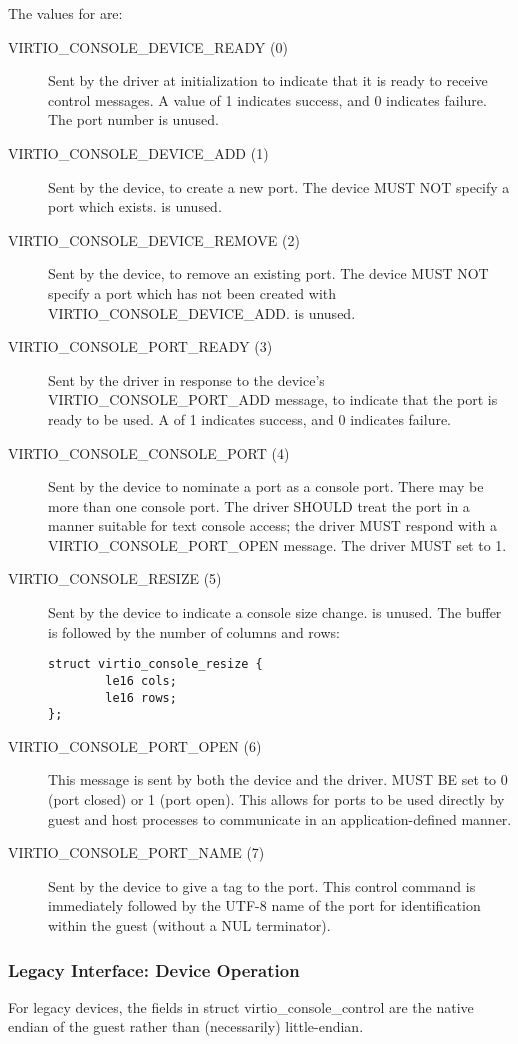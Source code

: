 The values for  are:
\begin{description}
\item [VIRTIO_CONSOLE_DEVICE_READY (0)] Sent by the driver at initialization
  to indicate that it is ready to receive control messages.  A value of
  1 indicates success, and 0 indicates failure.  The port number is unused.
\item [VIRTIO_CONSOLE_DEVICE_ADD (1)] Sent by the device, to create a new
  port.  The device MUST NOT specify a port which exists.   is unused.
\item [VIRTIO_CONSOLE_DEVICE_REMOVE (2)] Sent by the device, to remove an
  existing port.  The device MUST NOT specify a port which has not been
  created with VIRTIO_CONSOLE_DEVICE_ADD.   is unused.
\item [VIRTIO_CONSOLE_PORT_READY (3)] Sent by the driver in response
  to the device's VIRTIO_CONSOLE_PORT_ADD message, to indicate that
  the port is ready to be used. A  of 1 indicates success, and 0
  indicates failure.
\item [VIRTIO_CONSOLE_CONSOLE_PORT (4)] Sent by the device to nominate
  a port as a console port.  There may be more than one console port.
  The driver SHOULD treat the port in a manner suitable for text
  console access; the driver MUST respond with a VIRTIO_CONSOLE_PORT_OPEN
  message.  The driver MUST set  to 1.
\item [VIRTIO_CONSOLE_RESIZE (5)] Sent by the device to indicate
  a console size change.   is unused.  The buffer is followed by the number of columns and rows:
\begin{lstlisting}
struct virtio_console_resize {
        le16 cols;
        le16 rows;
};
\end{lstlisting}
\item [VIRTIO_CONSOLE_PORT_OPEN (6)] This message is sent by both the
  device and the driver.   MUST BE set to 0 (port
  closed) or 1 (port open).  This allows for ports to be used directly
  by guest and host processes to communicate in an application-defined
  manner.
\item [VIRTIO_CONSOLE_PORT_NAME (7)] Sent by the device to give a tag
  to the port.  This control command is immediately
  followed by the UTF-8 name of the port for identification
  within the guest (without a NUL terminator).
\end{description}

\subsubsection{Legacy Interface: Device Operation}\label{sec:Device Types / Console Device / Device Operation / Legacy Interface: Device Operation}
For legacy devices, the fields in struct virtio_console_control are the
native endian of the guest rather than (necessarily) little-endian.


